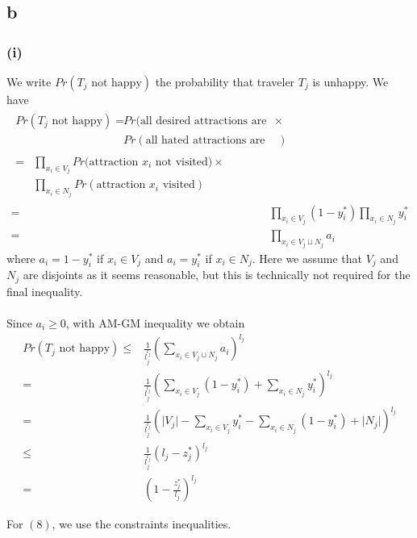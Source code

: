 \documentclass[a4paper, 11pt]{article}
\begin{document}
\subsection*{b}
\subsubsection*{(i)}
We write $Pr(T_j\text{ not happy})$ the probability that traveler $T_j$ is unhappy. We have
\begin{align}
\begin{split}
    Pr(T_j\text{ not happy}) ={}&Pr(\text{all desired attractions are not visited)}\times\\
    & Pr(\text{all hated attractions are visited})
\end{split}\\
\begin{split}
    ={}&\prod_{x_i\in V_j}Pr(\text{attraction } x_i \text{ not visited)}\times\\
    & \prod_{x_i\in N_j}Pr(\text{attraction } x_i \text{ visited})
\end{split}\\
    ={}& \prod_{x_i\in V_j}(1-y_i^*) \prod_{x_i\in N_j}y_i^*\\
    ={}& \prod_{x_i\in V_j\sqcup N_j} a_i
\end{align}
where $a_i=1-y_i^*$ if $x_i\in V_j$ and $a_i=y_i^*$ if $x_i\in N_j$. Here we assume that $V_j$ and $N_j$ are disjoints as it seems reasonable, but this is technically not required for the final inequality.\\\\
Since $a_i\geq 0$, with AM-GM inequality we obtain
\begin{align}
    Pr(T_j\text{ not happy}) \leq{}&\frac{1}{l_j^{l_j}}\left(\sum_{x_i\in V_j\sqcup N_j} a_i\right)^{l_j}\\
    ={}&\frac{1}{l_j^{l_j}}\left(\sum_{x_i\in V_j} (1-y_i^*)+\sum_{x_i\in N_j} y_i^*\right)^{l_j}\\
    ={}&\frac{1}{l_j^{l_j}}\left(\lvert V_j\rvert-\sum_{x_i\in V_j} y_i^*-\sum_{x_i\in N_j} (1-y_i^*)+\lvert N_j\rvert\right)^{l_j}\\
    \leq{}&\frac{1}{l_j^{l_j}}\left(l_j-z_j^*\right)^{l_j}\\
    ={}&\left(1-\frac{z_j^*}{l_j}\right)^{l_j}
\end{align}

For $(8)$, we use the constraints inequalities.
\end{document}
